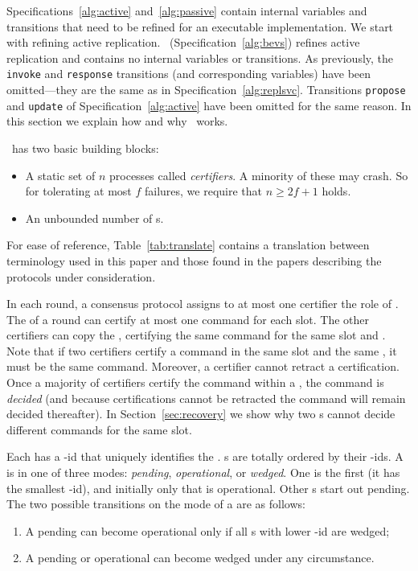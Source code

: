 \label{sec:bevs}

Specifications~\ref{alg:active} and~\ref{alg:passive} contain
internal variables and transitions
that need to be refined for an executable implementation.
We start with refining active replication.
\multiconsensus\
(Specification~\ref{alg:bevs}) refines active replication and contains
no internal variables or transitions.
As previously, the \texttt{invoke} and \texttt{response} transitions (and corresponding variables) have been
omitted---they are the same as in Specification~\ref{alg:replsvc}. Transitions
\texttt{propose} and \texttt{update} of Specification~\ref{alg:active} have been omitted for the same reason.
In this section we explain how and why \multiconsensus\ works.





\multiconsensus\ has two basic building blocks:
\begin{itemize}\item A static set of $n$ processes called \emph{certifiers}.
A minority of these may crash.  So for tolerating at most $f$
failures, we require that $n \ge 2f+1$ holds.
\item An unbounded number of \emph{{\round}}s.
\end{itemize}

\noindent
For ease of reference, Table~\ref{tab:translate}
contains a translation between terminology used in this paper
and those found in the papers describing the protocols under consideration.

In each round, a consensus protocol assigns to at most one certifier the role
of \emph{\sequencer}.
The {\sequencer} of a round can certify at most one command for each slot.
The other certifiers can copy the {\sequencer}, certifying the same
command for the same slot and {\round}.
Note that if two certifiers certify a command in the same
slot and the same {\round}, it must be the same command.
Moreover, a certifier cannot retract a certification.
Once a majority of certifiers certify
the command within a {\round}, the command is \emph{decided}
(and because certifications cannot be retracted the command will remain
decided thereafter).
In Section~\ref{sec:recovery} we show why
two {\round}s cannot decide different commands for the same slot.

Each {\round} has a {\round}-id that uniquely identifies the {\round}.
{\Round}s are totally ordered by their {\round}-ids.
A {\round} is in one of three modes: \emph{pending}, \emph{operational},
or \emph{wedged}.
One {\round} is the first {\round} (it has the smallest {\round}-id), and initially
only that {\round} is operational.  Other {\round}s start out pending.
The two possible transitions on the mode of a {\round} are as follows:
\begin{enumerate}\item A pending {\round} can become operational only if all {\round}s with
lower {\round}-id are wedged;
\item A pending or operational {\round} can become wedged under any
circumstance.
\end{enumerate}

